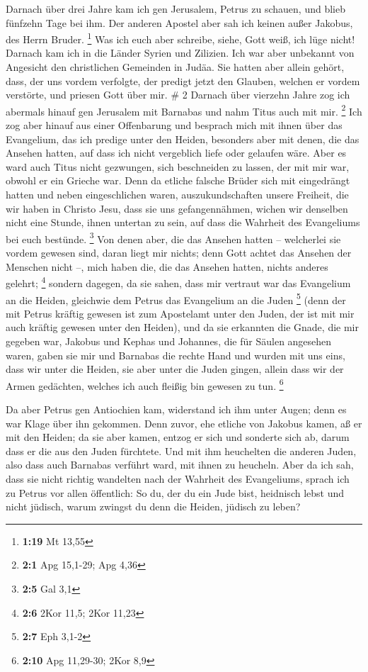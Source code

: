  Darnach über drei Jahre kam ich gen Jerusalem, Petrus zu
schauen, und blieb fünfzehn Tage bei ihm.  Der anderen
Apostel aber sah ich keinen außer Jakobus, des Herrn Bruder. \footnote{\textbf{1:19}
  Mt 13,55}  Was ich euch aber schreibe, siehe, Gott weiß,
ich lüge nicht!  Darnach kam ich in die Länder Syrien und
Zilizien.  Ich war aber unbekannt von Angesicht den
christlichen Gemeinden in Judäa.  Sie hatten aber allein
gehört, dass, der uns vordem verfolgte, der predigt jetzt den Glauben,
welchen er vordem verstörte,  und priesen Gott über mir. \#
2  Darnach über vierzehn Jahre zog ich abermals hinauf gen
Jerusalem mit Barnabas und nahm Titus auch mit mir. \footnote{\textbf{2:1}
  Apg 15,1-29; Apg 4,36}  Ich zog aber hinauf aus einer
Offenbarung und besprach mich mit ihnen über das Evangelium, das ich
predige unter den Heiden, besonders aber mit denen, die das Ansehen
hatten, auf dass ich nicht vergeblich liefe oder gelaufen wäre.
 Aber es ward auch Titus nicht gezwungen, sich beschneiden
zu lassen, der mit mir war, obwohl er ein Grieche war.  Denn
da etliche falsche Brüder sich mit eingedrängt hatten und neben
eingeschlichen waren, auszukundschaften unsere Freiheit, die wir haben
in Christo Jesu, dass sie uns gefangennähmen,  wichen wir
denselben nicht eine Stunde, ihnen untertan zu sein, auf dass die
Wahrheit des Evangeliums bei euch bestünde. \footnote{\textbf{2:5} Gal
  3,1}  Von denen aber, die das Ansehen hatten -- welcherlei
sie vordem gewesen sind, daran liegt mir nichts; denn Gott achtet das
Ansehen der Menschen nicht --, mich haben die, die das Ansehen hatten,
nichts anderes gelehrt; \footnote{\textbf{2:6} 2Kor 11,5; 2Kor 11,23}
 sondern dagegen, da sie sahen, dass mir vertraut war das
Evangelium an die Heiden, gleichwie dem Petrus das Evangelium an die
Juden \footnote{\textbf{2:7} Eph 3,1-2}  (denn der mit
Petrus kräftig gewesen ist zum Apostelamt unter den Juden, der ist mit
mir auch kräftig gewesen unter den Heiden),  und da sie
erkannten die Gnade, die mir gegeben war, Jakobus und Kephas und
Johannes, die für Säulen angesehen waren, gaben sie mir und Barnabas die
rechte Hand und wurden mit uns eins, dass wir unter die Heiden, sie aber
unter die Juden gingen,  allein dass wir der Armen
gedächten, welches ich auch fleißig bin gewesen zu tun. \footnote{\textbf{2:10}
  Apg 11,29-30; 2Kor 8,9}

 Da aber Petrus gen Antiochien kam, widerstand ich ihm
unter Augen; denn es war Klage über ihn gekommen.  Denn
zuvor, ehe etliche von Jakobus kamen, aß er mit den Heiden; da sie aber
kamen, entzog er sich und sonderte sich ab, darum dass er die aus den
Juden fürchtete.  Und mit ihm heuchelten die anderen Juden,
also dass auch Barnabas verführt ward, mit ihnen zu heucheln.
 Aber da ich sah, dass sie nicht richtig wandelten nach der
Wahrheit des Evangeliums, sprach ich zu Petrus vor allen öffentlich: So
du, der du ein Jude bist, heidnisch lebst und nicht jüdisch, warum
zwingst du denn die Heiden, jüdisch zu leben?

